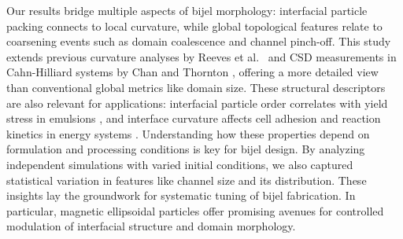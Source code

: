 Our results bridge multiple aspects of bijel morphology: interfacial particle packing connects to local curvature, while global topological features relate to coarsening events such as domain 
coalescence and channel pinch-off. This study extends previous curvature analyses by Reeves et al.~\cite{reeves_quantitative_2016} and CSD measurements in Cahn-Hilliard systems by Chan and 
Thornton \cite{chan_channel_2012}, offering a more detailed view than conventional global metrics like domain size. These structural descriptors are also relevant for applications: interfacial 
particle order correlates with yield stress in emulsions \cite{besseling_three-dimensional_2007, schall_structural_2007, madivala_exploiting_2009, vagberg_glassiness_2011, kaganyuk_shear-induced_2020}, 
and interface curvature affects cell adhesion and reaction kinetics in energy systems \cite{xiong_porosity_2024, shojaei_minimal_2022}.
Understanding how these properties depend on formulation and processing conditions is key for bijel design. By analyzing independent simulations with varied initial conditions, we also captured 
statistical variation in features like channel size and its distribution. These insights lay the groundwork for systematic tuning of bijel fabrication. In particular, magnetic ellipsoidal particles 
offer promising avenues for controlled modulation of interfacial structure and domain morphology.